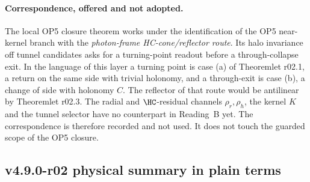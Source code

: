 \paragraph{Correspondence, offered and not adopted.}
The local OP5 closure theorem works under the identification of the OP5 near-kernel branch with the
\emph{photon-frame HC-cone/reflector route}.  Its halo invariance off tunnel candidates asks for a turning-point
readout before a through-collapse exit.  In the language of this layer a turning point is case (a) of Theoremlet r02.1,
a return on the same side with trivial holonomy, and a through-exit is case (b), a change of side with holonomy \(C\).
The reflector of that route would be antilinear by Theoremlet r02.3.  The radial and \(\HC\)-residual channels
\(\rho_r,\rho_h\), the kernel \(K\) and the tunnel selector have no counterpart in Reading~B yet.  The correspondence is
therefore recorded and not used.  It does not touch the guarded scope of the OP5 closure.

\subsection*{v4.9.0-r02 physical summary in plain terms}
\label{subsec:v490-r02-plain}


